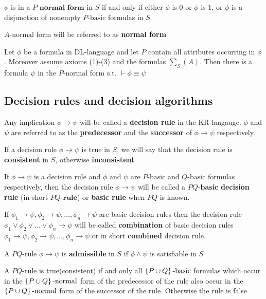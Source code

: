 \documentclass[11pt]{article}
\begin{document}
\(\phi\) is in a \(P\textbf{-normal form}\) in \(S\) if and only if either \(\phi\) is 0 or \(\phi\)
is 1, or \(\phi\) is a disjunction of nonempty \(P\text{-basic}\) formulas in \(S\)

\(A\text{-normal}\) form will be referred to as \textbf{normal form}

\begin{proposition}[7.4]
Let \(\phi\) be a formula in DL-language and let \(P\) contain all attributes
occurring in \(\phi\). Moreover assume axioms (1)-(3) and the formulas \(\sum_S(A)\).
Then there is a formula \(\psi\) in the \(P\text{-normal}\) form s.t. \(\vdash\phi\equiv\psi\)
\end{proposition}
\subsection{Decision rules and decision algorithms}
\label{sec:orgd4423d9}
Any implication \(\phi\to\psi\) will be called a \textbf{decision rule} in the KR-langauge. \(\phi\)
and \(\psi\) are referred to as the \textbf{predecessor} and the \textbf{successor} of \(\phi\to\psi\)
respectively. 

If a decision rule \(\phi\to\psi\) is true in \(S\), we will say that the decision rule
is \textbf{consistent} in \(S\), otherwise \textbf{inconsistent}

If \(\phi\to\psi\) is a decision rule and \(\phi\) and \(\psi\) are \(P\text{-basic}\) and
\(Q\text{-basic}\) formulas respectively, then the decision rule \(\phi\to\psi\) will
be called a \(PQ\textbf{-basic}\) \textbf{decision rule} (in short \(PQ\textbf{-rule}\))
or \textbf{basic rule} when \(PQ\) is
known.

If \(\phi_1 \to \psi,\phi_2 \to\psi,\dots,\phi_n \to\psi\) are basic decision rules
then the decision rule \(\phi_1 \vee\phi_2 \vee\dots\vee\phi_n \to\psi\) will be
called \textbf{combination} of basic decision rules \(\phi_1 \to \psi,\phi_2
   \to\psi,\dots,\phi_n \to\psi\) or in short  \textbf{combined} decision rule.

A \(PQ\text{-rule}\) \(\phi\to\psi\) is \textbf{admissible} in \(S\) if \(\phi\wedge\psi\) is satisfiable in \(S\)

\begin{proposition}[7.5]
A \(PQ\text{-rule}\) is true(consistent) if and only all \linebreak 
\(\left\{ P\cup Q\right\}\text{-basic}\) formulas which occur in the 
\(\left\{ P\cup Q\right\}\text{-normal}\)
form of the predecessor of the rule also occur in the 
\(\left\{ P\cup Q\right\}\text{-normal}\) form of the successor of the rule. Otherwise the
rule is false 
\end{proposition}
\end{document}

